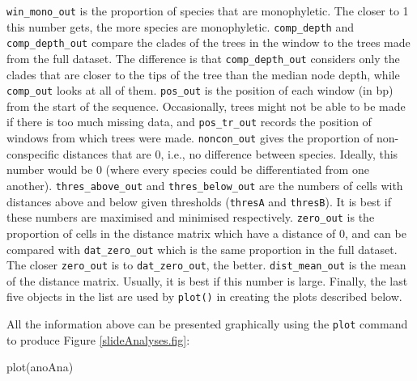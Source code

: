 \documentclass{article}
\newcommand{\fun}[1]{\texttt{#1}}
\begin{document}
\verb|win_mono_out| is the proportion of species that are monophyletic. The closer to 1 this number gets, the more species are monophyletic.
\verb|comp_depth| and \verb|comp_depth_out| compare the clades of the trees in the window to the trees made from the full dataset. The difference is that \verb|comp_depth_out| considers only the clades that are closer to the tips of the tree than the median node depth, while \verb|comp_out| looks at all of them.
\verb|pos_out| is the position of each window (in bp) from the start of the sequence. Occasionally, trees might not be able to be made if there is too much missing data, and \verb|pos_tr_out| records the position of windows from which trees were made.
\verb|noncon_out| gives the proportion of non-conspecific distances that are 0, i.e., no difference between species. Ideally, this number would be 0 (where every species could be differentiated from one another).
\verb|thres_above_out| and \verb|thres_below_out| are the numbers of cells with distances above and below given thresholds (\verb|thresA| and \verb|thresB|). It is best if these numbers are maximised and minimised respectively.
\verb|zero_out| is the proportion of cells in the distance matrix which have a distance of 0, and can be compared with \verb|dat_zero_out| which is the same proportion in the full dataset. The closer \verb|zero_out| is to \verb|dat_zero_out|, the better.
\verb|dist_mean_out| is the mean of the distance matrix. Usually, it is best if this number is large.
Finally, the last five objects in the list are used by \fun{plot()} in creating the plots  described below.

All the information above can be presented graphically using the \fun{plot} command to produce Figure \ref{slideAnalyses.fig}:

\begin{console}
plot(anoAna)
\end{console}
\end{document}
